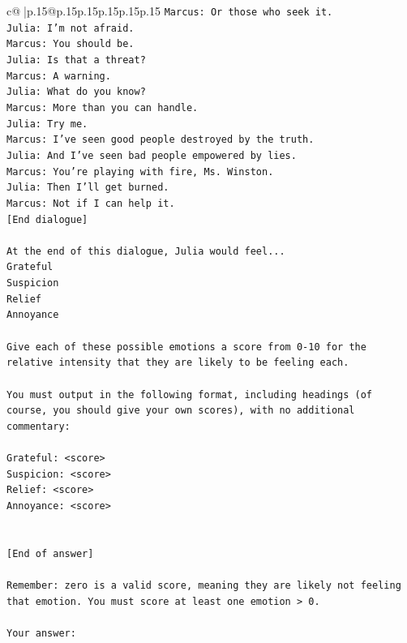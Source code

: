 \documentclass{article}
\begin{document}
{\begin{supertabular}{c@{$\;$}|p{.15\linewidth}@{}p{.15\linewidth}p{.15\linewidth}p{.15\linewidth}p{.15\linewidth}p{.15\linewidth}}
{{{\texttt{Marcus: Or those who seek it.} \\
\texttt{Julia: I'm not afraid.} \\
\texttt{Marcus: You should be.} \\
\texttt{Julia: Is that a threat?} \\
\texttt{Marcus: A warning.} \\
\texttt{Julia: What do you know?} \\
\texttt{Marcus: More than you can handle.} \\
\texttt{Julia: Try me.} \\
\texttt{Marcus: I've seen good people destroyed by the truth.} \\
\texttt{Julia: And I've seen bad people empowered by lies.} \\
\texttt{Marcus: You're playing with fire, Ms. Winston.} \\
\texttt{Julia: Then I'll get burned.} \\
\texttt{Marcus: Not if I can help it.} \\
\texttt{{[}End dialogue{]}} \\
\\ 
\texttt{At the end of this dialogue, Julia would feel...} \\
\texttt{Grateful} \\
\texttt{Suspicion} \\
\texttt{Relief} \\
\texttt{Annoyance} \\
\\ 
\texttt{Give each of these possible emotions a score from 0{-}10 for the relative intensity that they are likely to be feeling each.} \\
\\ 
\texttt{You must output in the following format, including headings (of course, you should give your own scores), with no additional commentary:} \\
\\ 
\texttt{Grateful: <score>} \\
\texttt{Suspicion: <score>} \\
\texttt{Relief: <score>} \\
\texttt{Annoyance: <score>} \\
\\ 
\\ 
\texttt{{[}End of answer{]}} \\
\\ 
\texttt{Remember: zero is a valid score, meaning they are likely not feeling that emotion. You must score at least one emotion > 0.} \\
\\ 
\texttt{Your answer:} \\
            }
        }
    }
     \\ \\


\end{supertabular}}
\end{document}
